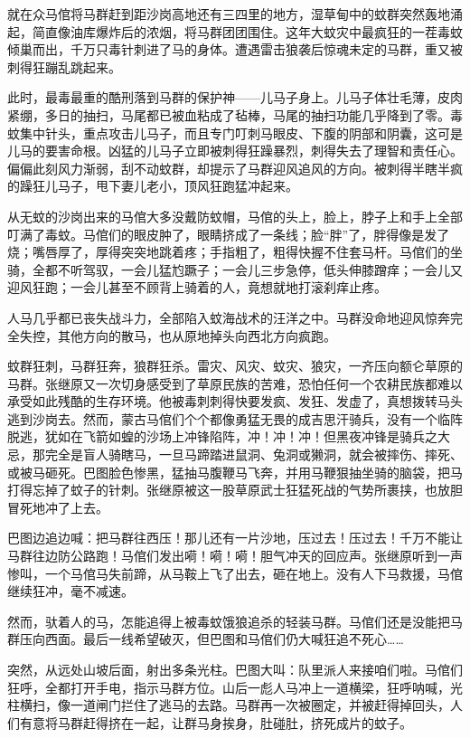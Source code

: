 \par 就在众马倌将马群赶到距沙岗高地还有三四里的地方，湿草甸中的蚊群突然轰地涌起，简直像油库爆炸后的浓烟，将马群团团围住。这年大蚊灾中最疯狂的一茬毒蚊倾巢而出，千万只毒针刺进了马的身体。遭遇雷击狼袭后惊魂未定的马群，重又被刺得狂蹦乱跳起来。
\par 此时，最毒最重的酷刑落到马群的保护神——儿马子身上。儿马子体壮毛薄，皮肉紧绷，多日的抽扫，马尾都已被血粘成了毡棒，马尾的抽扫功能几乎降到了零。毒蚊集中针头，重点攻击儿马子，而且专门叮刺马眼皮、下腹的阴部和阴囊，这可是儿马的要害命根。凶猛的儿马子立即被刺得狂躁暴烈，刺得失去了理智和责任心。偏偏此刻风力渐弱，刮不动蚊群，却提示了马群迎风追风的方向。被刺得半瞎半疯的躁狂儿马子，甩下妻儿老小，顶风狂跑猛冲起来。
\par 从无蚊的沙岗出来的马倌大多没戴防蚊帽，马倌的头上，脸上，脖子上和手上全部叮满了毒蚊。马倌们的眼皮肿了，眼睛挤成了一条线；脸“胖”了，胖得像是发了烧；嘴唇厚了，厚得突突地跳着疼；手指粗了，粗得快握不住套马杆。马倌们的坐骑，全都不听驾驭，一会儿猛尥蹶子；一会儿三步急停，低头伸膝蹭痒；一会儿又迎风狂跑；一会儿甚至不顾背上骑着的人，竟想就地打滚刹痒止疼。
\par 人马几乎都已丧失战斗力，全部陷入蚊海战术的汪洋之中。马群没命地迎风惊奔完全失控，其他方向的散马，也从原地掉头向西北方向疯跑。
\par 蚊群狂刺，马群狂奔，狼群狂杀。雷灾、风灾、蚊灾、狼灾，一齐压向额仑草原的马群。张继原又一次切身感受到了草原民族的苦难，恐怕任何一个农耕民族都难以承受如此残酷的生存环境。他被毒刺刺得快要发疯、发狂、发虚了，真想拨转马头逃到沙岗去。然而，蒙古马倌们个个都像勇猛无畏的成吉思汗骑兵，没有一个临阵脱逃，犹如在飞箭如蝗的沙场上冲锋陷阵，冲！冲！冲！但黑夜冲锋是骑兵之大忌，那完全是盲人骑瞎马，一旦马蹄踏进鼠洞、兔洞或獭洞，就会被摔伤、摔死、或被马砸死。巴图脸色惨黑，猛抽马腹鞭马飞奔，并用马鞭狠抽坐骑的脑袋，把马打得忘掉了蚊子的针刺。张继原被这一股草原武士狂猛死战的气势所裹挟，也放胆冒死地冲了上去。
\par 巴图边追边喊：把马群往西压！那儿还有一片沙地，压过去！压过去！千万不能让马群往边防公路跑！马倌们发出嗬！嗬！嗬！胆气冲天的回应声。张继原听到一声惨叫，一个马倌马失前蹄，从马鞍上飞了出去，砸在地上。没有人下马救援，马倌继续狂冲，毫不减速。
\par 然而，驮着人的马，怎能追得上被毒蚊饿狼追杀的轻装马群。马倌们还是没能把马群压向西面。最后一线希望破灭，但巴图和马倌们仍大喊狂追不死心……
\par 突然，从远处山坡后面，射出多条光柱。巴图大叫：队里派人来接咱们啦。马倌们狂呼，全都打开手电，指示马群方位。山后一彪人马冲上一道横梁，狂呼呐喊，光柱横扫，像一道闸门拦住了逃马的去路。马群再一次被圈定，并被赶得掉回头，人们有意将马群赶得挤在一起，让群马身挨身，肚碰肚，挤死成片的蚊子。
